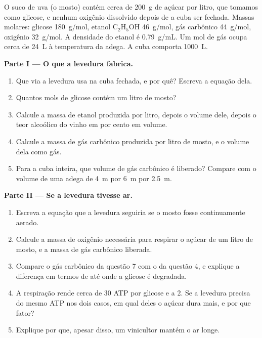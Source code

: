 \begin{problem}
\label{pb:g10:cell-metabolism:1}
O suco de uva (o mosto) contém cerca de \qty{200}{g} de açúcar por
litro, que tomamos como glicose, e nenhum oxigênio dissolvido depois de
a cuba ser fechada. Massas molares: glicose \qty{180}{g/mol}, etanol
$\mathrm{C_2H_5OH}$ \qty{46}{g/mol}, gás carbônico \qty{44}{g/mol},
oxigênio \qty{32}{g/mol}. A densidade do etanol é \qty{0.79}{g/mL}. Um
mol de gás ocupa cerca de \qty{24}{L} à temperatura da adega. A cuba
comporta \qty{1000}{L}.

\medskip
\noindent\textbf{Parte I --- O que a levedura fabrica.}
\begin{enumerate}
  \item Que via a levedura usa na cuba fechada, e por quê? Escreva a
        equação dela.
  \item Quantos mols de glicose contém um litro de mosto?
  \item Calcule a massa de etanol produzida por litro, depois o volume
        dele, depois o teor alcoólico do vinho em por cento em volume.
  \item Calcule a massa de gás carbônico produzida por litro de mosto,
        e o volume dela como gás.
  \item Para a cuba inteira, que volume de gás carbônico é liberado?
        Compare com o volume de uma adega de \qty{4}{m} por \qty{6}{m}
        por \qty{2.5}{m}.
\end{enumerate}

\medskip
\noindent\textbf{Parte II --- Se a levedura tivesse ar.}
\begin{enumerate}[resume]
  \item Escreva a equação que a levedura seguiria se o mosto fosse
        continuamente aerado.
  \item Calcule a massa de oxigênio necessária para respirar o açúcar
        de um litro de mosto, e a massa de gás carbônico liberada.
  \item Compare o gás carbônico da questão 7 com o da questão 4, e
        explique a diferença em termos de até onde a glicose é
        degradada.
  \item A respiração rende cerca de 30 ATP por glicose e a 
        2. Se a levedura precisa do mesmo ATP nos dois casos, em qual
        deles o açúcar dura mais, e por que fator?
  \item Explique por que, apesar disso, um vinicultor mantém o ar longe.
\end{enumerate}


\end{problem}

